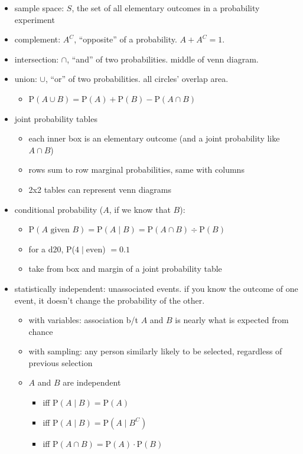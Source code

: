 \documentclass[11pt]{article}
\begin{document}
\begin{itemize}
  \item sample space: $S$, the set of all elementary outcomes in a probability experiment
  \item complement: $A^C$, ``opposite'' of a probability. $A + A^C = 1$.
  \item intersection: $\cap$, ``and'' of two probabilities. middle of venn diagram.
  \item union: $\cup$, ``or'' of two probabilities. all circles' overlap area.
  \begin{itemize}
    \item P$(A \cup B) = \text{P}(A) + \text{P}(B) - \text{P}(A \cap B)$
  \end{itemize}
  \item joint probability tables
  \begin{itemize}
    \item each inner box is an elementary outcome (and a joint probability like $A\cap B$)
    \item rows sum to row marginal probabilities, same with columns
    \item 2x2 tables can represent venn diagrams
  \end{itemize}
  \newpage
  \item conditional probability ($A$, if we know that $B$):
  \begin{itemize}
    \item P$(A \text{ given } B) = \text{P}(A \mid B) = \text{P}(A \cap B) \div \text{P}(B)$
    \item for a d20, P($4 \mid \text{even}$) $= 0.1$
    \item take from box and margin of a joint probability table
  \end{itemize}
  \item statistically independent: unassociated events. if you know the outcome of one event, it doesn't change the probability of the other.
  \begin{itemize}
    \item with variables: association b/t $A$ and $B$ is nearly what is expected from chance
    \item with sampling: any person similarly likely to be selected, regardless of previous selection
    \item $A$ and $B$ are independent
    \begin{itemize}
      \item iff $\text{P}(A\mid B) = \text{P}(A)$
      \item iff $\text{P}(A\mid B) = \text{P}(A\mid B^C)$
      \item iff $\text{P}(A \cap B) = \text{P}(A) \cdot \text{P}(B)$
    \end{itemize}
  \end{itemize}
\end{itemize}
\end{document}
